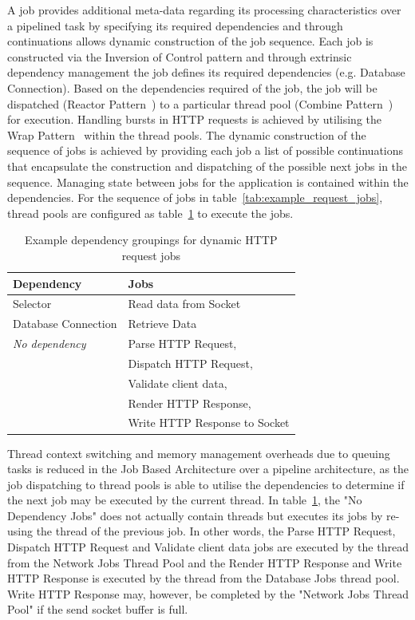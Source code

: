 \documentclass[conference]{ieee/IEEEtran}
\begin{document}
A job provides additional meta-data regarding its processing characteristics
over a pipelined task by specifying its required dependencies and through
continuations allows dynamic construction of the job sequence.  Each job is
constructed via the Inversion of Control pattern and through extrinsic
dependency management \cite{ioc} the job defines its required dependencies (e.g.
Database Connection).  Based on the dependencies required of the job, the job
will be dispatched (Reactor Pattern~\cite{reactor}) to a particular thread pool
(Combine Pattern~\cite{pipeline}) for execution.
Handling bursts in HTTP requests is achieved by utilising the Wrap
Pattern~\cite{pipeline} within the thread pools.  The dynamic construction of
the sequence of jobs is achieved by providing each job a list of possible
continuations \cite{continuations} that encapsulate the construction and
dispatching of the possible next jobs in the sequence.
Managing state between jobs for the application is contained within the
dependencies.  For the sequence of jobs in table~\ref{tab:example_request_jobs},
thread pools are configured as table~\ref{tab:example_request_thread_pools} to
execute the jobs.

\begin{table}[!t]
\renewcommand{\arraystretch}{1.3}
\caption{Example dependency groupings for dynamic HTTP request jobs}
\label{tab:example_request_thread_pools}
\centering
\begin{tabular}{l||l}
\hline
\bfseries Dependency & \bfseries Jobs \\
\hline
\hline
Selector & Read data from Socket \\
\hline
Database Connection & Retrieve Data \\
\hline
\textit{No dependency} & Parse HTTP Request, \\
& Dispatch HTTP Request, \\
& Validate client data, \\ 
& Render HTTP Response, \\
& Write HTTP Response to Socket \\
\hline
\end{tabular}
\end{table}

Thread context switching and memory management overheads due to queuing tasks
is reduced in the Job Based Architecture over a pipeline architecture, as the
job dispatching to thread pools is able to utilise the dependencies to
determine if the next job may be executed by the current thread.  In
table~\ref{tab:example_request_thread_pools}, the "No Dependency Jobs" does not
actually contain threads but executes its jobs by re-using the thread of the previous job.  In other words, the Parse
HTTP Request, Dispatch HTTP Request and Validate client data jobs are executed
by the thread from the Network Jobs Thread Pool and the Render HTTP Response
and Write HTTP Response is executed by the thread from the Database Jobs thread
pool.  Write HTTP Response may, however, be completed by the "Network Jobs
Thread Pool" if the send socket buffer is full.
\end{document}
